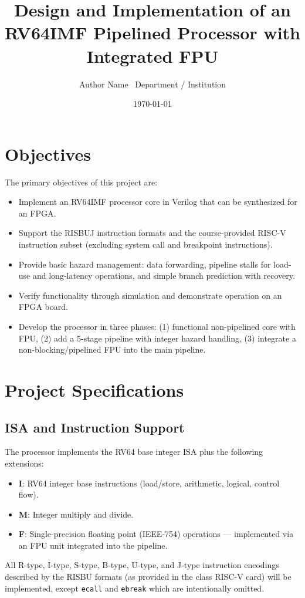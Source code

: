 \documentclass[11pt,a4paper]{article}
\title{Design and Implementation of an RV64IMF Pipelined Processor with Integrated FPU}
\author{Author Name \ Department / Institution}
\date{\today}
\begin{document}
\maketitle

\tableofcontents

\section{Objectives}
The primary objectives of this project are:
\begin{itemize}
\item Implement an RV64IMF processor core in Verilog that can be synthesized for an FPGA.
\item Support the RISBUJ instruction formats and the course-provided RISC-V instruction subset (excluding system call and breakpoint instructions).
\item Provide basic hazard management: data forwarding, pipeline stalls for load-use and long-latency operations, and simple branch prediction with recovery.
\item Verify functionality through simulation and demonstrate operation on an FPGA board.
\item Develop the processor in three phases: (1) functional non-pipelined core with FPU, (2) add a 5-stage pipeline with integer hazard handling, (3) integrate a non-blocking/pipelined FPU into the main pipeline.
\end{itemize}

\section{Project Specifications}

\subsection{ISA and Instruction Support}
The processor implements the RV64 base integer ISA plus the following extensions:
\begin{itemize}
\item \textbf{I}: RV64 integer base instructions (load/store, arithmetic, logical, control flow).
\item \textbf{M}: Integer multiply and divide.
\item \textbf{F}: Single-precision floating point (IEEE-754) operations — implemented via an FPU unit integrated into the pipeline.
\end{itemize}
All R-type, I-type, S-type, B-type, U-type, and J-type instruction encodings described by the RISBU formats (as provided in the class RISC-V card) will be implemented, except \texttt{ecall} and \texttt{ebreak} which are intentionally omitted.
\end{document}
